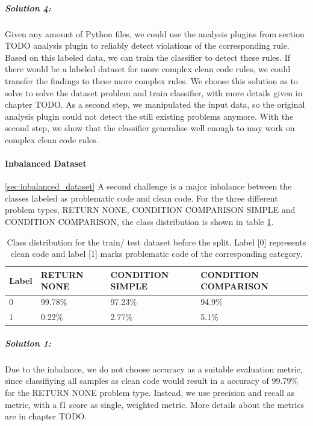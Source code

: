 \subparagraph{Solution 4:}
Given any amount of Python files, we could use the analysis plugins from section TODO analysis plugin to reliably detect violations of the corresponding rule. Based on this labeled data, we can train the classifier to detect these rules. If there would be a labeled dataset for more complex clean code rules, we could transfer the findings to these more complex rules. We choose this solution as to solve to solve the dataset problem and train classifier, with more details given in chapter TODO. As a second step, we manipulated the input data, so the original analysis plugin could not detect the still existing problems anymore. With the second step, we show that the classifier generalise well enough to may work on complex clean code rules.

\paragraph{Inbalanced Dataset}\ref{sec:inbalanced_dataset}
A second challenge is a major inbalance between the classes labeled as problematic code and clean code. For the three different problem types, RETURN NONE, CONDITION COMPARISON SIMPLE and CONDITION COMPARISON, the class distribution is shown in table \ref{tab:class_distribution_in_dataset}.



\begin{table}[]
    \begin{tabular}{@{}llll@{}}
    \toprule
    Label  & RETURN NONE & CONDITION SIMPLE & CONDITION COMPARISON \\ \midrule
    0 & 99.78\%     & 97.23\%          & 94.9\%              \\
    1 & 0.22\%      & 2.77\%           & 5.1\%               \\ \bottomrule
    \end{tabular}
    \caption{Class distribution for the train/ test dataset before the split. Label [0] represents clean code and label [1] marks problematic code of the corresponding category.}
    \label{tab:class_distribution_in_dataset}
    \end{table}


\subparagraph{Solution 1:}
Due to the inbalance, we do not choose accuracy as a suitable evaluation metric, since classifiying all samples as clean code would result in a accuracy of 99.79\% for the RETURN NONE problem type. Instead, we use precision and recall as metric, with a f1 score as single, weighted metric. More details about the metrics are in chapter TODO.


